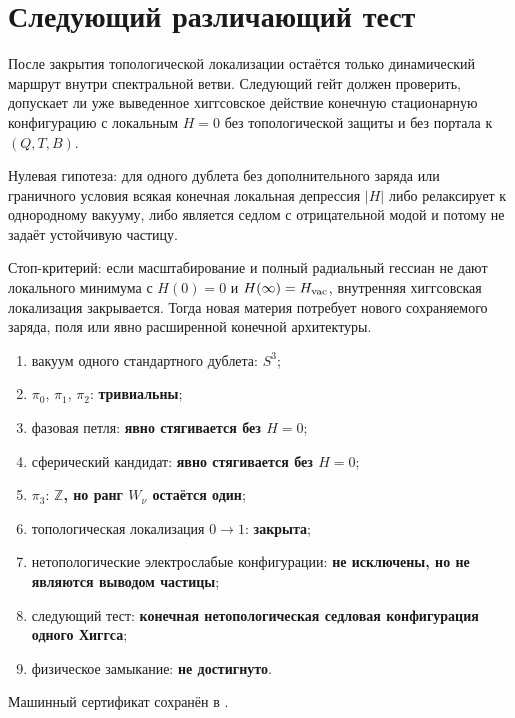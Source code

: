 \section{Следующий различающий тест}

После закрытия топологической локализации остаётся только динамический
маршрут внутри спектральной ветви. Следующий гейт
должен проверить, допускает ли уже выведенное хиггсовское действие
конечную стационарную конфигурацию с локальным $H=0$ без топологической
защиты и без портала к $(Q,T,B)$.

Нулевая гипотеза: для одного дублета без дополнительного заряда или
граничного условия всякая конечная локальная депрессия $|H|$ либо
релаксирует к однородному вакууму, либо является седлом с отрицательной
модой и потому не задаёт устойчивую частицу.

Стоп-критерий: если масштабирование и полный радиальный гессиан не дают
локального минимума с $H(0)=0$ и $H(\infty)=H_{\rm vac}$, внутренняя
хиггсовская локализация закрывается. Тогда новая материя потребует нового
сохраняемого заряда, поля или явно расширенной конечной архитектуры.

\begin{protocol}
\begin{enumerate}
 \item вакуум одного стандартного дублета: \textbf{$S^3$};
 \item $\pi_0$, $\pi_1$, $\pi_2$: \textbf{тривиальны};
 \item фазовая петля: \textbf{явно стягивается без $H=0$};
 \item сферический кандидат: \textbf{явно стягивается без $H=0$};
 \item $\pi_3$: \textbf{$\mathbb Z$, но ранг $W_\nu$ остаётся один};
 \item топологическая локализация $0\to1$: \textbf{закрыта};
 \item нетопологические электрослабые конфигурации:
 \textbf{не исключены, но не являются выводом частицы};
 \item следующий тест: \textbf{конечная нетопологическая седловая
 конфигурация одного Хиггса};
 \item физическое замыкание: \textbf{не достигнуто}.
\end{enumerate}
\end{protocol}

Машинный сертификат сохранён в
.

